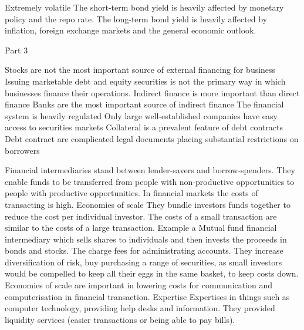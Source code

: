 \documentclass[12pt]{examnotes}
\begin{document}
\ra Extremely volatile
\ra The short-term bond yield is heavily affected by monetary policy and the repo rate.
\ra The long-term bond yield is heavily affected by inflation, foreign exchange markets and the general economic outlook.

\h{Part 3}

  Stocks are not the most important source of external financing for business
 Issuing marketable debt and equity securities is not the primary way in which businesses finance their operations.
 Indirect finance is more important than direct finance
 Banks are the most important source of indirect finance
 The financial system is heavily regulated
 Only large well-established companies have easy access to securities markets
 Collateral is a prevalent feature of debt contracts
 Debt contract are complicated legal documents placing substantial restrictions on borrowers 

\ra Financial intermediaries stand between lender-savers and borrow-spenders. 
\ra They enable funds to be transferred from people with non-productive opportunities to people with productive opportunities. 
\ra In financial markets the costs of transacting is high. 
 Economies of scale
\rna They bundle investors funds together to reduce the cost per  individual investor.
\rna The costs of a small transaction are similar to the costs of a large transaction. 
\rna Example a Mutual fund financial intermediary which sells shares to individuals and then invests the proceeds in bonds and stocks. The charge fees for administrating accounts.
\rna They increase diversification of risk, buy purchasing a range of securities, as small investors would be compelled to keep all their eggs in the same basket, to keep costs down. 
\rna Economies of scale are important in lowering costs for communication and computerisation in financial transaction.
 Expertise
\rna Expertises in things such as computer technology, providing help desks and information. 
\rna They provided liquidity services (easier transactions or being able to pay bills).
\end{document}
